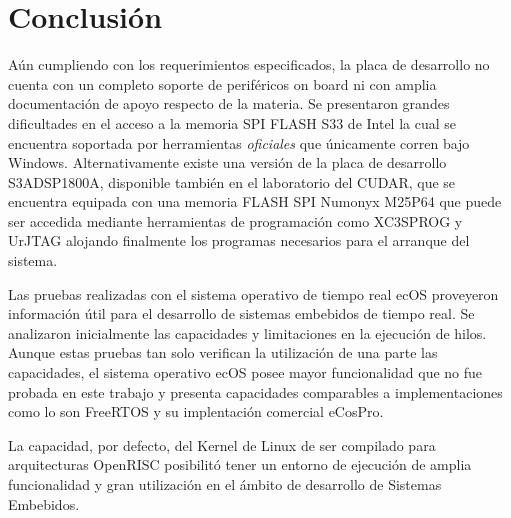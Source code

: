 \section{Conclusión}
 Aún cumpliendo con los requerimientos especificados, la placa de desarrollo no cuenta con un completo soporte de periféricos on board ni con amplia
 documentación de apoyo respecto de la materia. Se presentaron grandes dificultades en el acceso a la memoria SPI FLASH S33 de Intel la cual se encuentra soportada por
	herramientas \textit{oficiales} que únicamente corren bajo Windows. Alternativamente existe una versión de la placa de desarrollo S3ADSP1800A,
	disponible también en el laboratorio del CUDAR, que se encuentra equipada con una memoria FLASH SPI Numonyx M25P64 que puede ser accedida mediante
	herramientas de programación como XC3SPROG y UrJTAG alojando finalmente los programas necesarios para el arranque del sistema.
	
	Las pruebas realizadas con el sistema operativo de tiempo real ecOS proveyeron información útil para el desarrollo de sistemas embebidos de tiempo
	real. Se analizaron inicialmente las capacidades y limitaciones en la ejecución de hilos. Aunque estas pruebas tan solo verifican la utilización de
	una parte las capacidades, el sistema operativo ecOS posee mayor funcionalidad que no fue probada en este trabajo y presenta capacidades comparables
	a implementaciones como lo son FreeRTOS y su implentación comercial eCosPro.
	
	La capacidad, por defecto, del Kernel de Linux de ser compilado para arquitecturas OpenRISC posibilitó tener un entorno de ejecución de amplia
	funcionalidad y gran utilización en el ámbito de desarrollo de Sistemas Embebidos.  
	

	
	
	
	 